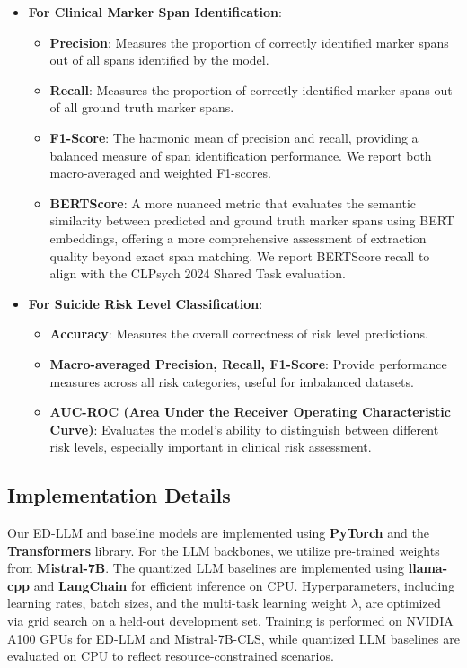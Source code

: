 \begin{itemize}
    \item \textbf{For Clinical Marker Span Identification}:
    \begin{itemize}
        \item \textbf{Precision}: Measures the proportion of correctly identified marker spans out of all spans identified by the model.
        \item \textbf{Recall}: Measures the proportion of correctly identified marker spans out of all ground truth marker spans.
        \item \textbf{F1-Score}: The harmonic mean of precision and recall, providing a balanced measure of span identification performance. We report both macro-averaged and weighted F1-scores.
        \item \textbf{BERTScore}:  A more nuanced metric that evaluates the semantic similarity between predicted and ground truth marker spans using BERT embeddings, offering a more comprehensive assessment of extraction quality beyond exact span matching. We report BERTScore recall to align with the CLPsych 2024 Shared Task evaluation.
    \end{itemize}
    \item \textbf{For Suicide Risk Level Classification}:
    \begin{itemize}
        \item \textbf{Accuracy}: Measures the overall correctness of risk level predictions.
        \item \textbf{Macro-averaged Precision, Recall, F1-Score}:  Provide performance measures across all risk categories, useful for imbalanced datasets.
        \item \textbf{AUC-ROC (Area Under the Receiver Operating Characteristic Curve)}:  Evaluates the model's ability to distinguish between different risk levels, especially important in clinical risk assessment.
    \end{itemize}
\end{itemize}

\subsection{Implementation Details}

Our ED-LLM and baseline models are implemented using \textbf{PyTorch} and the \textbf{Transformers} library.  For the LLM backbones, we utilize pre-trained weights from \textbf{Mistral-7B}.  The quantized LLM baselines are implemented using \textbf{llama-cpp} and \textbf{LangChain} for efficient inference on CPU.  Hyperparameters, including learning rates, batch sizes, and the multi-task learning weight $\lambda$, are optimized via grid search on a held-out development set.  Training is performed on NVIDIA A100 GPUs for ED-LLM and Mistral-7B-CLS, while quantized LLM baselines are evaluated on CPU to reflect resource-constrained scenarios.

